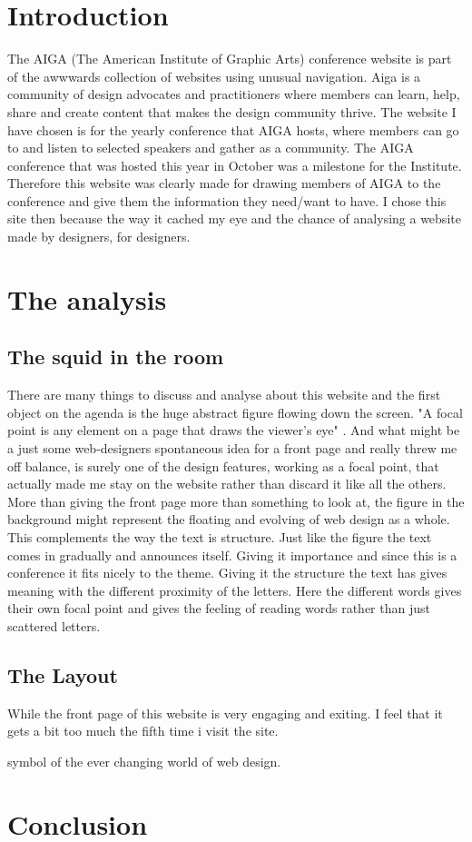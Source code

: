 \documentclass{article}
\begin{document}
    \section{Introduction}
	    The AIGA (The American Institute of Graphic Arts) conference website is part of the awwwards collection of websites using unusual navigation. Aiga is a community of design advocates and practitioners where members can learn, help, share and create content that makes the design community thrive. The website I have chosen is for the yearly conference that AIGA hosts, where members can go to and listen to selected speakers and gather as a community. The AIGA conference that was hosted this year in October was a milestone for the Institute. Therefore this website was clearly made for drawing members of AIGA to the conference and give them the information they need/want to have. I chose this site then because the way it cached my eye and the chance of analysing a website made by designers, for designers. 
    \section{The analysis}
	    \subsection{The squid in the room}
		    There are many things to discuss and analyse about this website and the first object on the agenda is the huge abstract figure flowing down the screen. "A focal point is any element on a page that draws the viewer’s eye" \citep[Page. 22]{PWebDesign}. And what might be a just some web-designers spontaneous idea for a front page and really threw me off balance, is surely one of the design features, working as a focal point, that actually made me stay on the website rather than discard it like all the others. More than giving the front page more than something to look at, the figure in the background might represent the floating and evolving of web design as a whole. This complements the way the text is structure. Just like the figure the text comes in gradually and announces itself. Giving it importance and since this is a conference it fits nicely to the theme. Giving it the structure the text has gives meaning with the different proximity of the letters. Here the different words gives their own focal point and gives the feeling of reading words rather than just scattered letters.      
        \subsection{The Layout}
	     While the front page of this website is very engaging and exiting. I feel that it gets a bit too much the fifth time i visit the site.
	     
	     symbol of the ever changing world of web design.
    \section{Conclusion}
	
    
    
\end{document}
